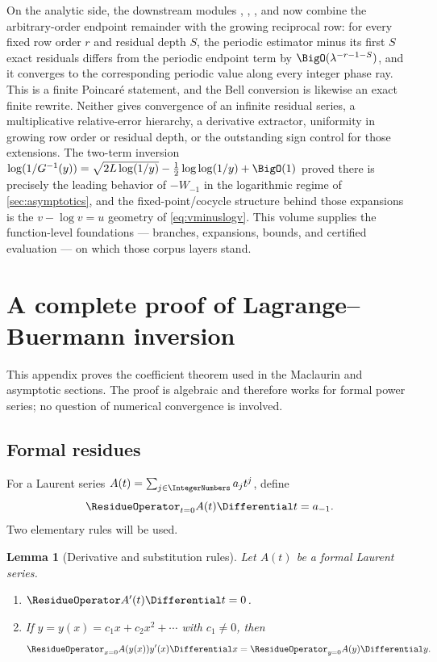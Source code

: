 \documentclass[11pt]{article}
\newtheorem{lemma}[lemma]{Lemma}
\theoremstyle{remark}
\begin{document}
On the analytic side, the downstream modules
,
,
, and
 now combine the arbitrary-order
endpoint remainder with the growing reciprocal row: for every fixed row
order \(r\) and residual depth \(S\), the periodic estimator minus its first
\(S\) exact residuals differs from the periodic endpoint term by
\(\BigO(\lambda^{-r-1-S})\), and it converges to the corresponding periodic
value along every integer phase ray.  This is a finite Poincar\'e statement,
and the Bell conversion is likewise an exact finite rewrite.  Neither gives
convergence of an infinite residual series, a multiplicative relative-error
hierarchy, a derivative extractor, uniformity in growing row order or
residual depth, or the outstanding sign control for those extensions.  The
two-term inversion
\(\log(1/G^{-1}(y))=\sqrt{2L\log(1/y)}-\tfrac12\log\log(1/y)+\BigO(1)\)
proved there is precisely the leading behavior of \(-W_{-1}\) in the
logarithmic regime of \cref{sec:asymptotics}, and the fixed-point/cocycle
structure behind those expansions is the \(v-\log v=u\) geometry of
\cref{eq:vminuslogv}.  This volume supplies the function-level foundations
--- branches, expansions, bounds, and certified evaluation --- on which
those corpus layers stand.

\clearpage
\appendix

\section{A complete proof of Lagrange--Buer\-mann inversion}
\label{app:lagrange}

This appendix proves the coefficient theorem used in the Maclaurin and
asymptotic sections.  The proof is algebraic and therefore works for formal
power series; no question of numerical convergence is involved.

\subsection{Formal residues}

For a Laurent series \(A(t)=\sum_{j\in\IntegerNumbers}a_jt^j\), define
\[
       \ResidueOperator_{t=0} A(t)\Differential t=a_{-1}.
\]
Two elementary rules will be used.

\begin{lemma}[Derivative and substitution rules]\label{lem:formal-residue}
Let \(A(t)\) be a formal Laurent series.
\begin{enumerate}[label=\textup{(\roman*)}]
\item \(\ResidueOperator A'(t)\Differential t=0\).
\item If \(y=y(x)=c_1x+c_2x^2+\cdots\) with \(c_1\neq0\), then
\begin{equation}\label{eq:formal-change}
       \ResidueOperator_{x=0}A(y(x))y'(x)\Differential x
       =\ResidueOperator_{y=0}A(y)\Differential y.
\end{equation}
\end{enumerate}
\end{lemma}
\end{document}
